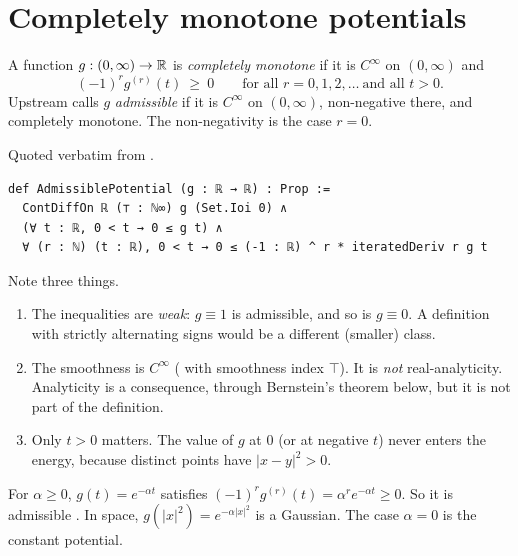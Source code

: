 \section{Completely monotone potentials}
\label{sec:cm}

\begin{definition}\label{def:cm}
A function $g:(0,\infty)\to\mathbb{R}$ is \emph{completely monotone} if it is $C^\infty$ on $(0,\infty)$ and
\[
  (-1)^r g^{(r)}(t)\ \ge\ 0\qquad\text{for all } r=0,1,2,\dots\ \text{and all } t>0.
\]
Upstream calls $g$ \emph{admissible} if it is $C^\infty$ on $(0,\infty)$, non-negative there, and completely monotone.
The non-negativity is the case $r=0$.
\end{definition}

\begin{leanbox}
Quoted verbatim from .
\begin{lstlisting}[language=Lean]
def AdmissiblePotential (g : ℝ → ℝ) : Prop :=
  ContDiffOn ℝ (⊤ : ℕ∞) g (Set.Ioi 0) ∧
  (∀ t : ℝ, 0 < t → 0 ≤ g t) ∧
  ∀ (r : ℕ) (t : ℝ), 0 < t → 0 ≤ (-1 : ℝ) ^ r * iteratedDeriv r g t
\end{lstlisting}
\end{leanbox}

Note three things.
\begin{enumerate}
\item The inequalities are \emph{weak}: $g\equiv1$ is admissible, and so is $g\equiv0$. A definition with strictly
alternating signs would be a different (smaller) class.
\item The smoothness is $C^\infty$ ( with smoothness index $\top$). It is \emph{not} real-analyticity. Analyticity is a
consequence, through Bernstein's theorem below, but it is not part of the definition.
\item Only $t>0$ matters. The value of $g$ at $0$ (or at negative $t$) never enters the energy, because distinct points
have $|x-y|^2>0$.
\end{enumerate}

\begin{example}[Gaussians]\label{ex:gauss}
For $\alpha\ge0$, $g(t)=e^{-\alpha t}$ satisfies $(-1)^rg^{(r)}(t)=\alpha^re^{-\alpha t}\ge0$. So it is admissible
\tierC{}. In space, $g(|x|^2)=e^{-\alpha|x|^2}$ is a Gaussian. The case $\alpha=0$ is the constant potential.
\end{example}


